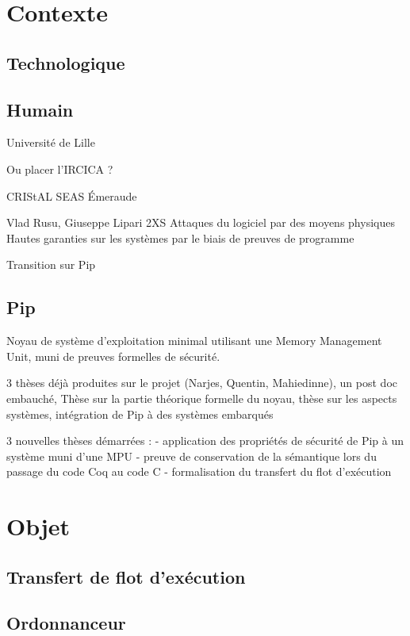
\section{Contexte}

\subsection{Technologique}

\subsection{Humain}

Université de Lille

Ou placer l'IRCICA ?

CRIStAL
	SEAS
		Émeraude
			
			Vlad Rusu, Giuseppe Lipari
		2XS
			Attaques du logiciel par des moyens physiques
			Hautes garanties sur les systèmes par le biais de preuves de programme

Transition sur Pip

\subsection{Pip}

Noyau de système d'exploitation minimal utilisant une Memory Management Unit, muni de preuves formelles de sécurité.

3 thèses déjà produites sur le projet (Narjes, Quentin, Mahiedinne), un post doc embauché,
Thèse sur la partie théorique formelle du noyau, thèse sur les aspects systèmes, intégration de Pip à des systèmes embarqués

3 nouvelles thèses démarrées : 
- application des propriétés de sécurité de Pip à un système muni d'une MPU
- preuve de conservation de la sémantique lors du passage du code Coq au code C
- formalisation du transfert du flot d'exécution

\section{Objet}

\subsection{Transfert de flot d'exécution}

\subsection{Ordonnanceur}

